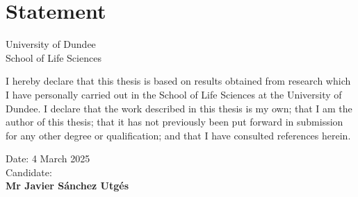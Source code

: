 \chapter*{Statement}

\begin{center}
    \LARGE University of Dundee\\[1cm]
    \LARGE School of Life Sciences\\[2cm]
\end{center}

I hereby declare that this thesis is based on results obtained from research which I have personally carried out in the School of Life Sciences at the University of Dundee. I declare that the work described in this thesis is my own; that I am the author of this thesis; that it has not previously been put forward in submission for any other degree or qualification; and that I have consulted references herein.

\vfill

\begin{flushright}
    Date: 4 March 2025\\[1cm]
    Candidate:{\hspace{2cm}}
    \\[1cm]
    \textbf{Mr Javier Sánchez Utgés}
\end{flushright}